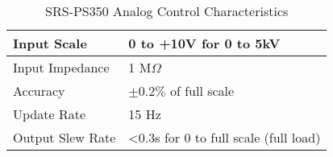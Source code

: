 \begin{table}[ht!]
\centering
\begin{tabular}{| l | l | }
\hline
Input Scale      & 0 to +10V for 0 to 5kV                          \\ \hline
Input Impedance  & 1 M$\Omega$                                     \\ \hline
Accuracy         & $\pm 0.2\%$ of full scale                       \\ \hline
Update Rate      & 15 Hz                                           \\ \hline
Output Slew Rate & \textless 0.3s for 0 to full scale (full load)  \\ \hline
\end{tabular}
\caption{SRS-PS350 Analog Control Characteristics \cite{srsManual}\cite{srsCatalog}}
\label{table:srsCtrl_table}
\end{table}
